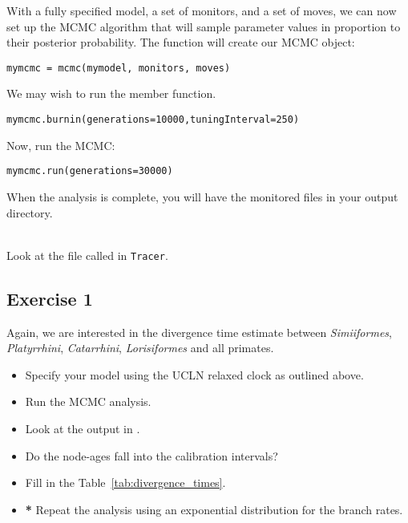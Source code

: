 With a fully specified model, a set of monitors, and a set of moves, we can now set up the MCMC algorithm that will sample parameter values in proportion to their posterior probability. 
The  function will create our MCMC object:
{\tt \begin{snugshade*}
\begin{lstlisting}
mymcmc = mcmc(mymodel, monitors, moves)
\end{lstlisting}
\end{snugshade*}}

We may wish to run the  member function.
{\tt \begin{snugshade*}
\begin{lstlisting}
mymcmc.burnin(generations=10000,tuningInterval=250)
\end{lstlisting}
\end{snugshade*}}

Now, run the MCMC:
{\tt \begin{snugshade*}
\begin{lstlisting}
mymcmc.run(generations=30000)
\end{lstlisting}
\end{snugshade*}}

When the analysis is complete, you will have the monitored files in your output directory.

\noindent \\ \impmark Look at the file called  in \texttt{Tracer}.


\subsection{Exercise 1}

Again, we are interested in the divergence time estimate between \emph{Simiiformes}, \emph{Platyrrhini}, \emph{Catarrhini}, \emph{Lorisiformes} and all primates.

\begin{itemize}
\item Specify your model using the UCLN relaxed clock as outlined above.
\item Run the MCMC analysis.
\item Look at the output in \Tracer.
\item Do the node-ages fall into the calibration intervals?
\item Fill in the Table~\ref{tab:divergence_times}.
\item \textbf{*} Repeat the analysis using an exponential distribution for the branch rates.
\end{itemize}

